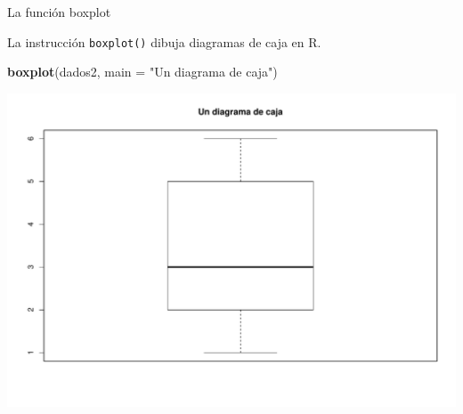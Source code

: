 \documentclass[
  ignorenonframetext,
]{beamer}
\newenvironment{Shaded}{\begin{snugshade}}{\end{snugshade}}
\newcommand{\DataTypeTok}[1]{\textcolor[rgb]{0.13,0.29,0.53}{#1}}
\newcommand{\KeywordTok}[1]{\textcolor[rgb]{0.13,0.29,0.53}{\textbf{#1}}}
\newcommand{\NormalTok}[1]{#1}
\newcommand{\StringTok}[1]{\textcolor[rgb]{0.31,0.60,0.02}{#1}}
\begin{document}
\begin{frame}[fragile]{La función boxplot}
\protect\hypertarget{la-funciuxf3n-boxplot}{}

La instrucción \texttt{boxplot()} dibuja diagramas de caja en R.

\begin{Shaded}
\begin{Highlighting}[]
\KeywordTok{boxplot}\NormalTok{(dados2, }\DataTypeTok{main =} \StringTok{"Un diagrama de caja"}\NormalTok{)}
\end{Highlighting}
\end{Shaded}

\includegraphics{Tema8.-Datos-Cuantitativos_files/figure-beamer/unnamed-chunk-25-1.pdf}

\end{frame}
\end{document}
